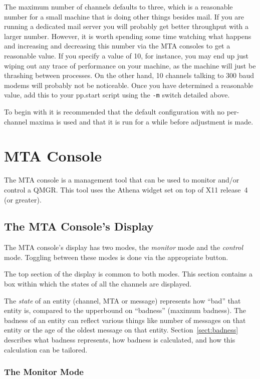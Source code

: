 The maximum number of channels defaults to three, which is a reasonable
number for a small machine that is doing other things besides mail. If
you are running a dedicated mail server you will probably get better
throughput with a larger number. However, it is worth spending some
time watching what happens and increasing and decreasing this number
via the MTA consoles to get a reasonable value. If you specify a value
of 10, for instance, you may end up just wiping out any trace of
performance on your machine, as the machine will just be thrashing
between processes. On the other hand, 10 channels talking to 300 baud
modems will probably not be noticeable.
Once you have determined a reasonable value, add this to your
pp.start script using the \verb|-m| switch detailed above.

To begin with it is recommended that the default configuration with
no per-channel maxima is used and that it is run for a while before
adjustment is made.

\section {MTA Console}

The MTA console is a management tool that can be used to monitor
and/or control a QMGR.  This tool uses the Athena widget set on top of
X11 release~4 (or greater).

\subsection	{The MTA Console's Display}

The MTA console's display has two modes, the {\em monitor} mode
and the {\em control} mode.
Toggling between these modes is done via the appropriate button.

The top section of the display is common to both modes. 
This section contains a box within which the states of all the
channels are displayed.

The {\em state} of an entity (channel, MTA or message) represents how
``bad'' that entity is, compared to the upperbound on ``badness''
(maximum badness).
The badness of an entity can reflect various things like number of
messages on that entity or the age of the oldest message on that
entity.
Section~\ref{sect:badness} describes what badness represents, how
badness is calculated, and how this calculation can be tailored.

\subsubsection	{The Monitor Mode}

